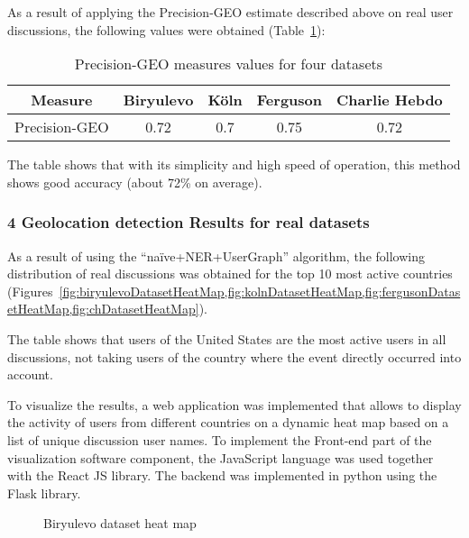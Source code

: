As a result of applying the Precision-GEO estimate described above on real user discussions, the following values were obtained (Table~\cref{tab:precisionGEOValues2}):

\begin{table}[ht]%
	\centering
	\caption{Precision-GEO measures values for four datasets}%
	\label{tab:precisionGEOValues2}%
	\begin{tabular}{ c  c  c  c  c }%
		\toprule
		Measure & Biryulevo & Köln & Ferguson & Charlie Hebdo\\
		\hline
		Precision-GEO & 0.72 & 0.7 & 0.75 & 0.72 \\
		\bottomrule
	\end{tabular}%
\end{table}

The table shows that with its simplicity and high speed of operation, this method shows good accuracy (about 72\% on average).

\subsubsection{4 Geolocation detection Results for real datasets}

As a result of using the “naïve+NER+UserGraph” algorithm, the following distribution of real discussions was obtained for the top 10 most active countries (Figures~\cref{fig:biryulevoDatasetHeatMap,fig:kolnDatasetHeatMap,fig:fergusonDatasetHeatMap,fig:chDatasetHeatMap}).

The table shows that users of the United States are the most active users in all discussions, not taking users of the country where the event directly occurred into account.

To visualize the results, a web application was implemented that allows to display the activity of users from different countries on a dynamic heat map based on a list of unique discussion user names. To implement the Front-end part of the visualization software component, the JavaScript language was used together with the React JS library. The backend was implemented in python using the Flask library.

\begin{figure}[ht]
	\caption{Biryulevo dataset heat map}\label{fig:biryulevoDatasetHeatMap}
\end{figure}

